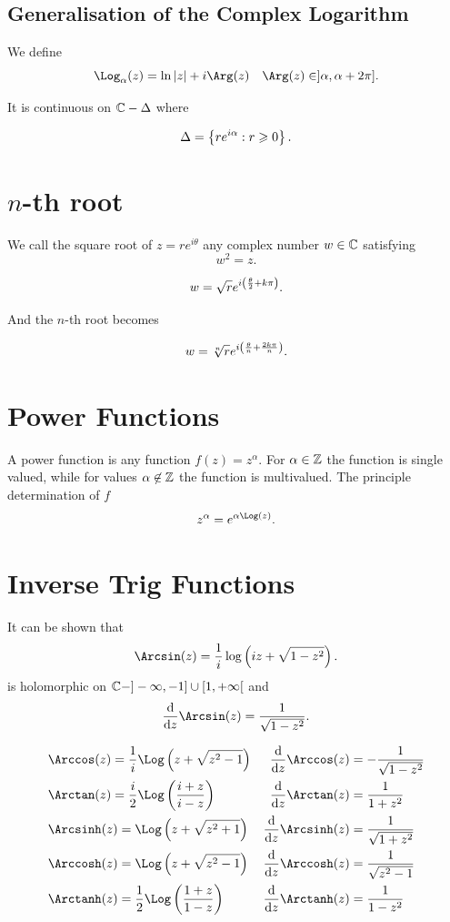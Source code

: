 \documentclass{report}
\begin{document}
\subsection{Generalisation of the Complex Logarithm}

We define
\[
	\Log_\alpha(z) = \ln|z| + i\Arg(z) \quad \Arg(z)\in ]\alpha,\alpha+2\pi]
	.\]

It is continuous on $\CC-\Delta$ where

\[
	\Delta = \left\{re^{i\alpha}: r\geqslant 0\right\}
	.\]

\section{$n$-th root}

We call the square root of $z=re^{i\theta}$ any complex number $w\in\CC$ satisfying
\[
	w^2 = z
	.\]

\[
	w = \sqrt{r} e^{i\left(\frac{\theta}{2}+k\pi\right)}
	.\]

And the $n$-th root becomes

\[
	w = \sqrt[n]{r} e^{i\left(\frac{\theta}{n}+\frac{2k\pi}{n}\right)}
	.\]

\section{Power Functions}

A power function is any function $f(z) = z^\alpha$. For $\alpha\in\ZZ$ the function is single valued, while for values $\alpha\not\in\ZZ$ the function is multivalued. The principle determination of $f$
\[
	z^\alpha = e^{\alpha\Log(z)}
	.\]

\section{Inverse Trig Functions}

It can be shown that
\[
	\Arcsin(z) = \frac{1}{i}\log\lt(iz+\sqrt{1-z^2}\rt)
	.\]
is holomorphic on $\CC - ]-\infty,-1]\cup[1,+\infty[$ and
\[
	\dv{}{z}\Arcsin(z) = \frac{1}{\sqrt{1-z^2}}
	.\]

\begin{align*}
	 & \Arccos(z)=\frac{1}{i}\Log\lt(z+\sqrt{z^2-1}\rt)   & \dv{}{z}\Arccos(z)  & = -\frac{1}{\sqrt{1-z^2}} \\
	 & \Arctan(z)=\frac{i}{2}\Log\lt(\frac{i+z}{i-z}\rt)  & \dv{}{z}\Arctan(z)  & = \frac{1}{1+z^2}         \\
	 & \Arcsinh(z)=\Log\lt(z+\sqrt{z^2+1}\rt)             & \dv{}{z}\Arcsinh(z) & = \frac{1}{\sqrt{1+z^2}}  \\
	 & \Arccosh(z)=\Log\lt(z+\sqrt{z^2-1}\rt)             & \dv{}{z}\Arccosh(z) & = \frac{1}{\sqrt{z^2-1}}  \\
	 & \Arctanh(z)=\frac{1}{2}\Log\lt(\frac{1+z}{1-z}\rt) & \dv{}{z}\Arctanh(z) & = \frac{1}{1-z^2}         \\
\end{align*}
\end{document}

